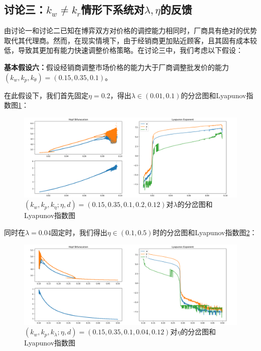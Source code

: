 \documentclass{article}
\begin{document}
\subsection{讨论三：$k_w\neq k_r$情形下系统对$\lambda, \eta$的反馈}\label{sec_3_3}
\par 由讨论一和讨论二已知在博弈双方对价格的调控能力相同时，厂商具有绝对的优势取代其代理商。然而，在现实情境下，由于经销商更加贴近顾客，且其固有成本较低，导致其更加有能力快速调整价格策略。在讨论三中，我们考虑以下假设：
\par \textbf{基本假设六：}假设经销商调整市场价格的能力大于厂商调整批发价的能力$(k_w, k_p, k_\theta)=(0.15,0.35,0.1)$。
\par 在此假设下，我们首先固定$\eta=0.2$，得出$\lambda\in(0.01,0.1)$的分岔图和Lyapunov指数图\ref{Hopf_Lyapunov_3_1}：
\begin{figure}[htp]
    \centering
    \includegraphics[width=16.5cm]{Hopf_Lyapunov_3_1.png}
    \caption{$(k_w,k_p,k_\eta;\eta,d)=(0.15,0.35,0.1,0.2,0.12)$对$\lambda$的分岔图和Lyapunov指数图}
    \label{Hopf_Lyapunov_3_1}
\end{figure}
\par 同时在$\lambda=0.04$固定时，我们得出$\eta\in(0.1, 0.5)$时的分岔图和Lyapunov指数图\ref{Hopf_Lyapunov_3_2}：
\begin{figure}[htp]
    \centering
    \includegraphics[width=16.5cm]{Hopf_Lyapunov_3_2.png}
    \caption{$(k_w,k_p,k_\lambda;\eta,d)=(0.15,0.35,0.1,0.04,0.12)$对$\eta$的分岔图和Lyapunov指数图}
    \label{Hopf_Lyapunov_3_2}
\end{figure}
\end{document}
